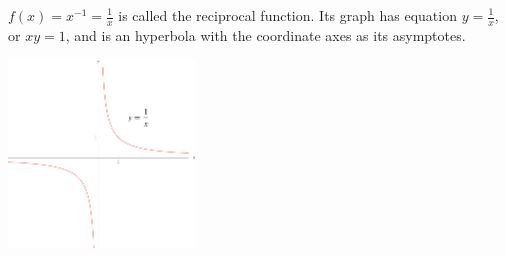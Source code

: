 \begin{frame}
$f(x) = x^{-1} = \frac{1}{x}$ is called the reciprocal function.  Its graph has equation $y = \frac{1}{x}$, or $xy = 1$, and is an hyperbola with the coordinate axes as its asymptotes.
\begin{center}
\includegraphics[height=5cm]{precalculus/pictures/reciprocal-function.pdf}%
\end{center}
\end{frame}
